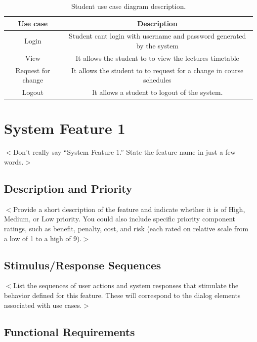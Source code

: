 \documentclass{scrreprt}
\begin{document}
\begin{table}[h!]
  \begin{center}
    \caption{Student use case diagram description.}
    \label{tab:table1}
    \begin{tabular}{|c|c|} 
\hline
      \textbf{Use case} & \textbf{Description} \\
 
      \hline
     Login& Student cant login with username and password generated by the system \\
\hline
      View  &  It allows the student to to view  the lectures  timetable \\
\hline
       Request for change& It allows the student to  to request for a change in course schedules\\
\hline
 
Logout&  It allows a student to logout of the system.\\
\hline
  \end{tabular}
  \end{center}
\end{table}
\section{System Feature 1}
$<$Don’t really say “System Feature 1.” State the feature name in just a few 
words.$>$

\subsection{Description and Priority}
$<$Provide a short description of the feature and indicate whether it is of 
High, Medium, or Low priority. You could also include specific priority 
component ratings, such as benefit, penalty, cost, and risk (each rated on
relative scale from a low of 1 to a high of 9).$>$

\subsection{Stimulus/Response Sequences}
$<$List the sequences of user actions and system responses that stimulate the 
behavior defined for this feature. These will correspond to the dialog elements 
associated with use cases.$>$

\subsection{Functional Requirements}
 
\end{document}
